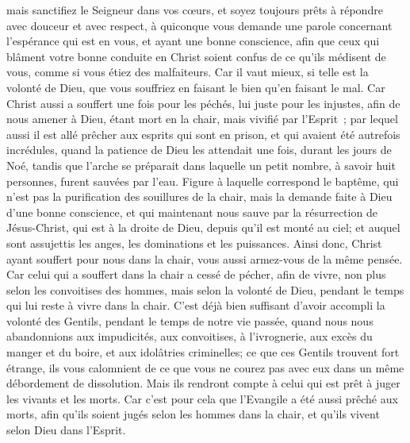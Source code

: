 \begin{multicols}{2}
mais sanctifiez le Seigneur dans vos cœurs, et soyez toujours prêts à répondre avec douceur et avec respect, à quiconque vous demande une parole concernant l'espérance qui est en vous,
et ayant une bonne conscience, afin que ceux qui blâment votre bonne conduite en Christ soient confus de ce qu'ils médisent de vous, comme si vous étiez des malfaiteurs.
Car il vaut mieux, si telle est la volonté de Dieu, que vous souffriez en faisant le bien qu'en faisant le mal.
Car Christ aussi a souffert une fois pour les péchés, lui juste pour les injustes, afin de nous amener à Dieu, étant mort en la chair, mais vivifié par l'Esprit~;
par lequel aussi il est allé prêcher aux esprits qui sont en prison,
et qui avaient été autrefois incrédules, quand la patience de Dieu les attendait une fois, durant les jours de Noé, tandis que l'arche se préparait dans laquelle un petit nombre, à savoir huit personnes, furent sauvées par l'eau.
Figure à laquelle correspond le baptême, qui n'est pas la purification des souillures de la chair, mais la demande faite à Dieu d'une bonne conscience, et qui maintenant nous sauve par la résurrection de Jésus-Christ,
qui est à la droite de Dieu, depuis qu'il est monté au ciel; et auquel sont assujettis les anges, les dominations et les puissances.
\VerseOne{}Ainsi donc, Christ ayant souffert pour nous dans la chair, vous aussi armez-vous de la même pensée. Car celui qui a souffert dans la chair a cessé de pécher,
afin de vivre, non plus selon les convoitises des hommes, mais selon la volonté de Dieu, pendant le temps qui lui reste à vivre dans la chair.
C'est déjà bien suffisant d'avoir accompli la volonté des Gentils, pendant le temps de notre vie passée, quand nous nous abandonnions aux impudicités, aux convoitises, à l'ivrognerie, aux excès du manger et du boire, et aux idolâtries criminelles;
ce que ces Gentils trouvent fort étrange, ils vous calomnient de ce que vous ne courez pas avec eux dans un même débordement de dissolution.
Mais ils rendront compte à celui qui est prêt à juger les vivants et les morts.
Car c'est pour cela que l'Evangile a été aussi prêché aux morts, afin qu'ils soient jugés selon les hommes dans la chair, et qu'ils vivent selon Dieu dans l'Esprit.

\end{multicols}
